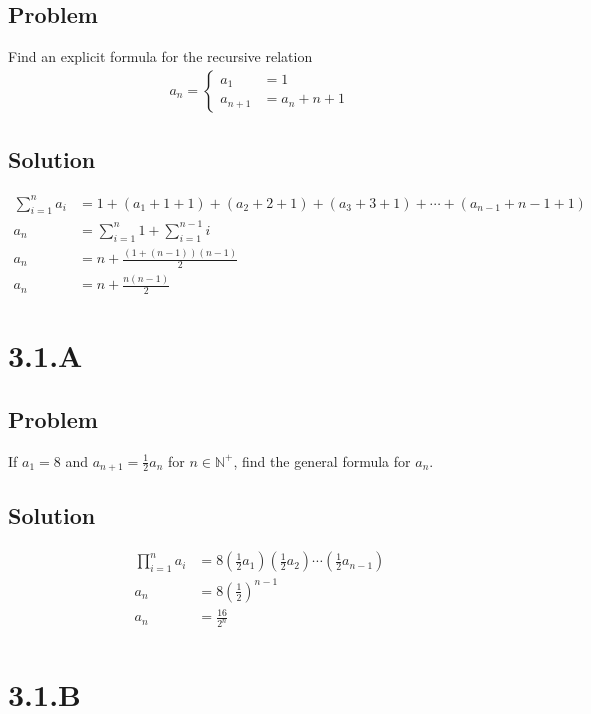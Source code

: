 \documentclass[12pt]{article}
\newcommand{\round}[1]{\left(       #1 \right)      }
\newcommand{\N}    [0]{\mathbb{N}                   }
\begin{document}
\subsection*{Problem}
Find an explicit formula for the recursive relation
\begin{align*}
    a_n = \begin{cases}
        a_1 &= 1 \\
        a_{n + 1} &= a_n + n + 1
    \end{cases}
\end{align*}

\subsection*{Solution}
\begin{align*}
    \sum_{i = 1}^n a_i &= 1 + (a_1 + 1 + 1) + (a_2 + 2 + 1) + (a_3 + 3 + 1) + \cdots + (a_{n - 1} + n - 1 + 1) \\
    a_n &= \sum_{i = 1}^n 1 + \sum_{i = 1}^{n - 1} i \\
    a_n &= n + \frac{(1 + (n - 1)) (n - 1)}{2} \\
    a_n &= n + \frac{n(n - 1)}{2}
\end{align*}



\section*{3.1.A}

\subsection*{Problem}
If $a_1 = 8$ and $a_{n+1} = \frac{1}{2} a_{n}$ for $n \in \N^+$, find the general formula for $a_n$.

\subsection*{Solution}
\begin{align*}
    \prod_{i = 1}^n a_i &= 8 \round{\frac{1}{2} a_1} \round{\frac{1}{2} a_2} \cdots \round{\frac{1}{2} a_{n - 1}} \\
    a_n &= 8 \round{\frac{1}{2}}^{n-1} \\
    a_n &= \frac{16}{2^n} \\
\end{align*}



\section*{3.1.B}
\end{document}
